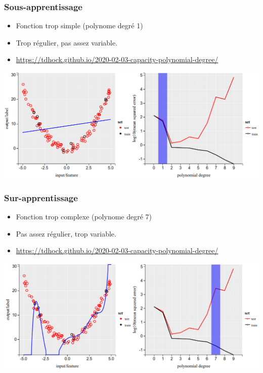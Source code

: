 \documentclass{beamer}
\begin{document}
\begin{frame}
  \frametitle{Sous-apprentissage}
  \begin{itemize}
  \item Fonction trop simple (polynome degré 1)
  \item Trop régulier, pas assez variable.
  \item \tiny \url{https://tdhock.github.io/2020-02-03-capacity-polynomial-degree/}
  \end{itemize}
  \includegraphics[width=\textwidth]{poly-under}
\end{frame}

\begin{frame}
  \frametitle{Sur-apprentissage}
  \begin{itemize}
  \item Fonction trop complexe (polynome degré 7)
  \item Pas assez régulier, trop variable.
  \item \tiny \url{https://tdhock.github.io/2020-02-03-capacity-polynomial-degree/}
  \end{itemize}
  \includegraphics[width=\textwidth]{poly-overfit}
\end{frame}
\end{document}
